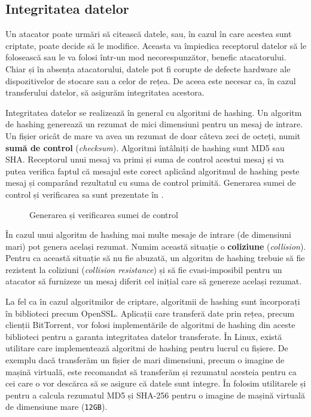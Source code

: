 \subsection{Integritatea datelor}
\label{sec:sec:data:integrity}

Un atacator poate urmări să citească datele, sau, în cazul în care acestea sunt criptate, poate decide să le modifice. Aceasta va împiedica receptorul datelor să le folosească sau le va folosi într-un mod necorespunzător, benefic atacatorului. Chiar și în absența atacatorului, datele pot fi corupte de defecte hardware ale dispozitivelor de stocare sau a celor de rețea. De aceea este necesar ca, în cazul transferului datelor, să asigurăm integritatea acestora.

Integritatea datelor se realizează în general cu algoritmi de hashing. Un algoritm de hashing generează un rezumat de mici dimensiuni pentru un mesaj de intrare. Un fișier oricât de mare va avea un rezumat de doar câteva zeci de octeți, numit \textbf{sumă de control} (\textit{checksum}). Algoritmi întâlniți de hashing sunt MD5 sau SHA. Receptorul unui mesaj va primi și suma de control acestui mesaj și va putea verifica faptul că mesajul este corect aplicând algoritmul de hashing peste mesaj și comparând rezultatul cu suma de control primită. Generarea sumei de control și verificarea sa sunt prezentate în .

\begin{figure}[htbp]
  \centering
  \def\svgwidth{\columnwidth}
  
  \caption{Generarea și verificarea sumei de control}
  \label{fig:sec:checksum}
\end{figure}

În cazul unui algoritm de hashing mai multe mesaje de intrare (de dimensiuni mari) pot genera același rezumat. Numim această situație o \textbf{coliziune} (\textit{collision}). Pentru ca această situație să nu fie abuzată, un algoritm de hashing trebuie să fie rezistent la coliziuni (\textit{collision resistance}) și să fie cvasi-imposibil pentru un atacator să furnizeze un mesaj diferit cel inițial care să genereze același rezumat.

La fel ca în cazul algoritmilor de criptare, algoritmii de hashing sunt încorporați în biblioteci precum OpenSSL. Aplicații care transferă date prin rețea, precum clienții BitTorrent, vor folosi implementările de algoritmi de hashing din aceste biblioteci pentru a garanta integritatea datelor transferate. În Linux, există utilitare care implementează algoritmi de hashing pentru lucrul cu fișiere. De exemplu dacă transferăm un fișier de mari dimensiuni, precum o imagine de mașină virtuală, este recomandat să transferăm și rezumatul acesteia pentru ca cei care o vor descărca să se asigure că datele sunt integre. În  folosim utilitarele  și  pentru a calcula rezumatul MD5 și SHA-256 pentru o imagine de mașină virtuală de dimensiune mare (\texttt{12GB}).

